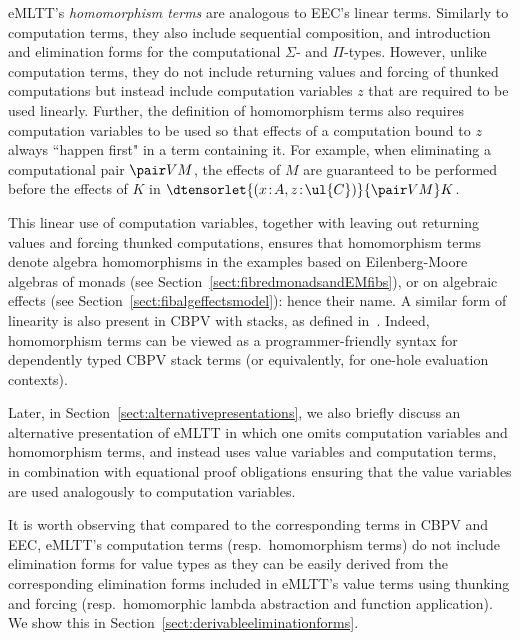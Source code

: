 eMLTT's \emph{homomorphism terms} are analogous to EEC's linear terms. Similarly to computation terms, they also include sequential composition, and introduction and elimination forms for the computational $\Sigma$- and $\Pi$-types. However, unlike computation terms, they do not include returning values and forcing of thunked computations but instead include computation variables $z$ that are required to be used linearly. Further, the definition of homomorphism terms also requires computation variables to be used so that effects of a computation bound to $z$ always ``happen first" in a term containing it. For example, when eliminating a computational pair $\pair V M$, the effects of $M$ are guaranteed to be performed before the effects of $K$ in ${\dtensorlet {(x \!:\! A , z \!:\! \ul{C})} {\pair V M} K}$.

This linear use of computation variables, together with leaving out returning values and forcing thunked computations, ensures that homomorphism terms denote algebra homomorphisms in the examples based on Eilenberg-Moore algebras of monads (see Section~\ref{sect:fibredmonadsandEMfibs}), or on algebraic effects (see Section~\ref{sect:fibalgeffectsmodel}): hence their name. 
A similar form of linearity is also present in CBPV with stacks, as defined in~\cite[\S 2.3.4]{Levy:CBPV}. Indeed,  homomorphism terms can be viewed as a programmer-friendly syntax for dependently typed CBPV stack terms (or equivalently, for one-hole evaluation contexts). 

Later, in Section~\ref{sect:alternativepresentations}, we also briefly discuss an alternative presentation of eMLTT in which one omits computation variables and homomorphism terms, and instead uses value variables and computation terms, in combination with equational proof obligations ensuring that the value variables are used analogously to computation variables.

It is worth observing that compared to the corresponding terms in CBPV and EEC, eMLTT's computation terms (resp.~homomorphism terms) do not include elimination forms for value types as they can be easily derived from the corresponding elimination forms included in eMLTT's value terms using thunking and forcing (resp.~homomorphic lambda abstraction and function application). We show this in Section~\ref{sect:derivableeliminationforms}.




